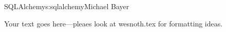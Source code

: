 \begin{aosachapter}{SQLAlchemy}{s:sqlalchemy}{Michael Bayer}

Your text goes here---pleaes look at wesnoth.tex for formatting ideas.

\end{aosachapter}
